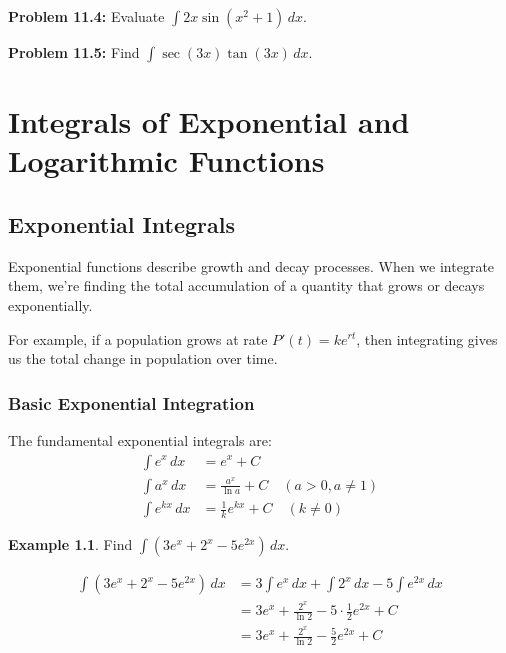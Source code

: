 \documentclass[12pt,a4paper]{book}
\theoremstyle{definition}
\newtheorem{example}{Example}[chapter]
\begin{document}
\textbf{Problem 11.4:} Evaluate $\int 2x \sin(x^2 + 1) \, dx$.

\textbf{Problem 11.5:} Find $\int \sec(3x) \tan(3x) \, dx$.

\chapter{Integrals of Exponential and Logarithmic Functions}

\section{Exponential Integrals}

\begin{intuition}
Exponential functions describe growth and decay processes. When we integrate them, we're finding the total accumulation of a quantity that grows or decays exponentially.

For example, if a population grows at rate $P'(t) = ke^{rt}$, then integrating gives us the total change in population over time.
\end{intuition}

\subsection{Basic Exponential Integration}

\begin{keyformula}
The fundamental exponential integrals are:
\begin{align}
\int e^x \, dx &= e^x + C\\
\int a^x \, dx &= \frac{a^x}{\ln a} + C \quad (a > 0, a \neq 1)\\
\int e^{kx} \, dx &= \frac{1}{k}e^{kx} + C \quad (k \neq 0)
\end{align}
\end{keyformula}

\begin{example}
Find $\int (3e^x + 2^x - 5e^{2x}) \, dx$.

\begin{align}
\int (3e^x + 2^x - 5e^{2x}) \, dx &= 3\int e^x \, dx + \int 2^x \, dx - 5\int e^{2x} \, dx\\
&= 3e^x + \frac{2^x}{\ln 2} - 5 \cdot \frac{1}{2}e^{2x} + C\\
&= 3e^x + \frac{2^x}{\ln 2} - \frac{5}{2}e^{2x} + C
\end{align}
\end{example}
\end{document}
